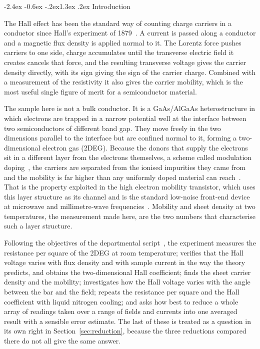 \documentclass[11pt,a4paper]{article}
\makeatletter
\renewcommand\section{\@startsection{section}{1}{\z@}%
  {-2.4ex \@plus -0.6ex \@minus -.2ex}{1.3ex \@plus .2ex}%
  {\normalfont\large\bfseries}}
\makeatother
\begin{document}
\section{Introduction}

The Hall effect has been the standard way of counting charge carriers in a conductor since
Hall's experiment of 1879~\cite{hall1879}. A current is passed along a conductor and a
magnetic flux density is applied normal to it. The Lorentz force pushes carriers to one
side, charge accumulates until the transverse electric field it creates cancels that force,
and the resulting transverse voltage gives the carrier density directly, with its sign
giving the sign of the carrier charge. Combined with a measurement of the resistivity it
also gives the carrier mobility, which is the most useful single figure of merit for a
semiconductor material.

The sample here is not a bulk conductor. It is a GaAs/AlGaAs heterostructure in which
electrons are trapped in a narrow potential well at the interface between two semiconductors
of different band gap. They move freely in the two dimensions parallel to the interface but
are confined normal to it, forming a two-dimensional electron gas (2DEG). Because the donors
that supply the electrons sit in a different layer from the electrons themselves, a scheme
called modulation doping~\cite{dingle1978}, the carriers are separated from the ionised
impurities they came from and the mobility is far higher than any uniformly doped material
can reach~\cite{stormer1979}. That is the property exploited in the high electron mobility
transistor, which uses this layer structure as its channel and is the standard low-noise
front-end device at microwave and millimetre-wave frequencies~\cite{sze2012}. Mobility and
sheet density at two temperatures, the measurement made here, are the two numbers that
characterise such a layer structure.

Following the objectives of the departmental script~\cite{script}, the experiment measures
the resistance per square of the 2DEG at room temperature; verifies that the Hall voltage
varies with flux density and with sample current in the way the theory predicts, and obtains
the two-dimensional Hall coefficient; finds the sheet carrier density and the mobility;
investigates how the Hall voltage varies with the angle between the bar and the field;
repeats the resistance per square and the Hall coefficient with liquid nitrogen cooling; and
asks how best to reduce a whole array of readings taken over a range of fields and currents
into one averaged result with a sensible error estimate. The last of these is treated as a
question in its own right in Section~\ref{sec:reduction}, because the three reductions
compared there do not all give the same answer.
\end{document}
